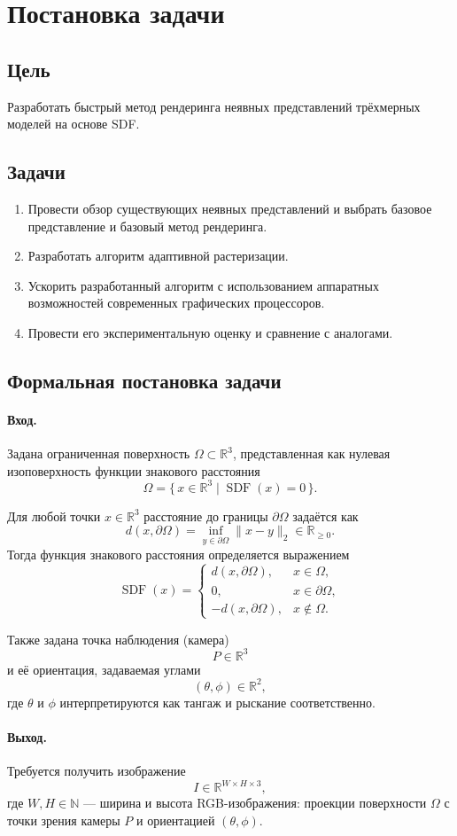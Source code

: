 \section{Постановка задачи}

\subsection{Цель}
Разработать быстрый метод рендеринга неявных представлений трёхмерных моделей на основе SDF.
\subsection{Задачи}
\begin{enumerate}
\item Провести обзор существующих неявных представлений и выбрать базовое представление и базовый метод рендеринга.
\item Разработать алгоритм адаптивной растеризации.
\item Ускорить разработанный алгоритм с использованием аппаратных возможностей современных графических процессоров.
\item Провести его экспериментальную оценку и сравнение с аналогами.
\end{enumerate}

\subsection{Формальная постановка задачи}

\paragraph{Вход.}
Задана ограниченная поверхность \(\Omega \subset \mathbb{R}^3\),
представленная как нулевая изоповерхность функции знакового расстояния
\[
\Omega = \{\, x \in \mathbb{R}^3 \mid \operatorname{SDF}(x) = 0 \,\}.
\]

Для любой точки \(x \in \mathbb{R}^3\) расстояние до границы \(\partial\Omega\) задаётся как
\[
d(x,\partial\Omega) = \inf_{y \in \partial\Omega} \lVert x - y \rVert_2 \in \mathbb{R}_{\ge 0}.
\]
Тогда функция знакового расстояния определяется выражением
\[
\operatorname{SDF}(x) =
\begin{cases}
 d(x,\partial\Omega),   & x \in \Omega,\\[2pt]
 0,                     & x \in \partial\Omega,\\[2pt]
 -d(x,\partial\Omega),  & x \notin \Omega.
\end{cases}
\]

Также задана точка наблюдения (камера)
\[
P \in \mathbb{R}^3
\]
и её ориентация, задаваемая углами
\[
(\theta,\phi) \in \mathbb{R}^2,
\]
где \(\theta\) и \(\phi\) интерпретируются как тангаж и рыскание соответственно.

\paragraph{Выход.}
Требуется получить изображение
\[
I \in \mathbb{R}^{W \times H \times 3},
\]
где \(W,H \in \mathbb{N}\) --- ширина и высота RGB-изображения: проекции поверхности \(\Omega\) с точки зрения камеры \(P\) и ориентацией \((\theta,\phi)\).